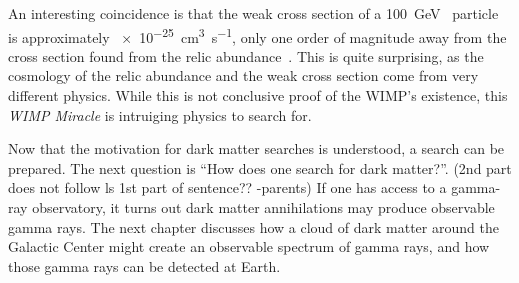 An interesting coincidence is that the weak cross section of a \SI{100}{\GeV{}} particle is approximately \SI{e-25}{cm^3s^{-1}}, only one order of magnitude away from the cross section found from the relic abundance~\cite{Jungman:1995df}.
This is quite surprising, as the cosmology of the relic abundance and the weak cross section come from very different physics.
While this is not conclusive proof of the WIMP's existence, this \textit{WIMP Miracle} is intruiging physics to search for.

Now that the motivation for dark matter searches is understood, a search can be prepared.
The next question is ``How does one search for dark matter?''.
{\color{red}(2nd part does not follow ls 1st part of sentence?? -parents)}
If one has access to a gamma-ray observatory, it turns out dark matter annihilations may produce observable gamma rays.
The next chapter discusses how a cloud of dark matter around the Galactic Center might create an observable spectrum of gamma rays, and how those gamma rays can be detected at Earth.

